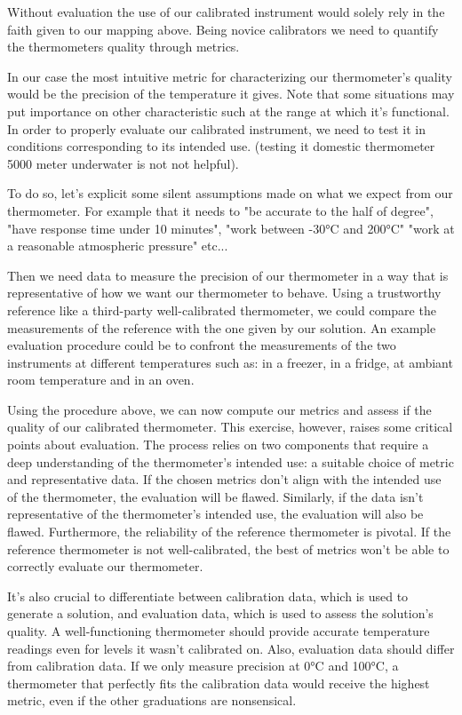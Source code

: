 \begin{bibunit}
Without evaluation the use of our calibrated instrument would solely rely in the faith given to our mapping above.
Being novice calibrators we need to quantify the thermometers quality through metrics.

In our case the most intuitive metric for characterizing our thermometer's quality would be the precision of the temperature it gives.
Note that some situations may put importance on other characteristic such at the range at which it's functional.
  In order to properly evaluate our calibrated instrument, we need to test it in conditions corresponding to its intended use. (testing it domestic thermometer 5000 meter underwater is not not helpful).

 To do so, let's explicit some silent assumptions made on what we expect from our thermometer.
  For example that it needs to "be accurate to the half of degree", "have response time under 10 minutes", "work between -30°C and 200°C" "work at a reasonable atmospheric pressure" etc...

Then we need data to measure the precision of our thermometer in a way that is representative of how we want our thermometer to behave. Using a trustworthy reference like a third-party well-calibrated thermometer, we could compare the measurements of the reference with the one given by our solution.
  An example evaluation procedure could be to confront the measurements of the two instruments at different temperatures such as: in a freezer, in a fridge, at ambiant room temperature and in an oven.

Using the procedure above, we can now compute our metrics and assess if the quality of our calibrated thermometer.
This exercise, however, raises some critical points about evaluation. The process relies on two components that require a deep understanding of the thermometer's intended use: a suitable choice of metric and representative data. If the chosen metrics don't align with the intended use of the thermometer, the evaluation will be flawed. Similarly, if the data isn't representative of the thermometer's intended use, the evaluation will also be flawed.
 Furthermore, the reliability of the reference thermometer is pivotal. If the reference thermometer is not well-calibrated, the best of metrics won't be able to correctly evaluate our thermometer. 

It's also crucial to differentiate between calibration data, which is used to generate a solution, and evaluation data, which is used to assess the solution's quality.
A well-functioning thermometer should provide accurate temperature readings even for levels it wasn't calibrated on. Also, evaluation data should differ from calibration data. If we only measure precision at 0°C and 100°C, a thermometer that perfectly fits the calibration data would receive the highest metric, even if the other graduations are nonsensical.



\end{bibunit}
